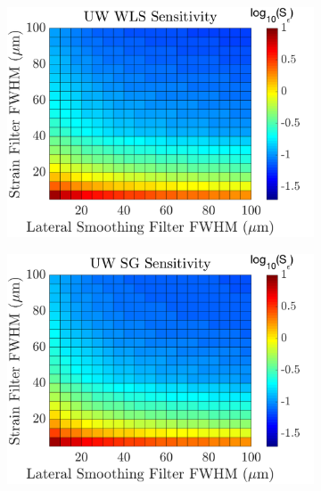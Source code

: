 \begin{figure}[h!]
	\centering
    	\begin{subfigure}{0.49\textwidth}
    		\centering
	        \includegraphics[width=\textwidth]{appendix_figs/wls_sensitivity.png}
	\end{subfigure}
	\begin{subfigure}{0.49\textwidth}
    		\centering
	        \includegraphics[width=\textwidth]{appendix_figs/uwsg_sensitivity.png}
	\end{subfigure}
    	\\
    	\begin{subfigure}{0.49\textwidth}
    		\centering

\end{subfigure}
\end{figure}
